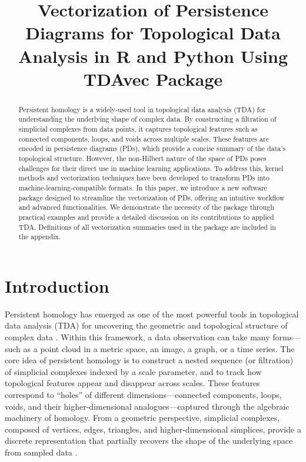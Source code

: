 \documentclass[conference, onecolumn]{IEEEtran}
\title{Vectorization of Persistence Diagrams for Topological Data Analysis in R and Python Using TDAvec Package}
\author{
\IEEEauthorblockN{Aleksei Luchinskii}
\IEEEauthorblockA{\textit{Bowling Green State University} \\
Bowling Green, OH, USA \\
aluchi@bgsu.edu}
\and 
\IEEEauthorblockN{Umar Islambekov}
\IEEEauthorblockA{\textit{Bowling Green State University} \\
Bowling Green, OH, USA \\
iumar@bgsu.edu}
}
\begin{document}
\maketitle{}
\begin{abstract}
Persistent homology is a widely-used tool in topological data analysis (TDA) for understanding the underlying shape of complex data. By constructing a filtration of simplicial complexes from data points, it captures topological features such as connected components, loops, and voids across multiple scales. These features are encoded in persistence diagrams (PDs), which provide a concise summary of the data's topological structure. However, the non-Hilbert nature of the space of PDs poses challenges for their direct use in machine learning applications. To address this, kernel methods and vectorization techniques have been developed to transform PDs into machine-learning-compatible formats. In this paper, we introduce a new software package designed to streamline the vectorization of PDs, offering an intuitive workflow and advanced functionalities. We demonstrate the necessity of the package through practical examples and provide a detailed discussion on its contributions to applied TDA. Definitions of all vectorization summaries used in the package are included in the appendix.
\end{abstract}

\section{Introduction}


Persistent homology has emerged as one of the most powerful tools in topological data analysis (TDA) for uncovering the geometric and topological structure of complex data \cite{Carlsson:2009, edelsbrunner2010computational, chazal2021introduction}. Within this framework, a data observation can take many forms—such as a point cloud in a metric space, an image, a graph, or a time series. The core idea of persistent homology is to construct a nested sequence (or filtration) of simplicial complexes indexed by a scale parameter, and to track how topological features appear and disappear across scales. These features correspond to “holes” of different dimensions—connected components, loops, voids, and their higher-dimensional analogues—captured through the algebraic machinery of homology. From a geometric perspective, simplicial complexes, composed of vertices, edges, triangles, and higher-dimensional simplices, provide a discrete representation that partially recovers the shape of the underlying space from sampled data \cite{nanda2013simplicial}.
\end{document}
